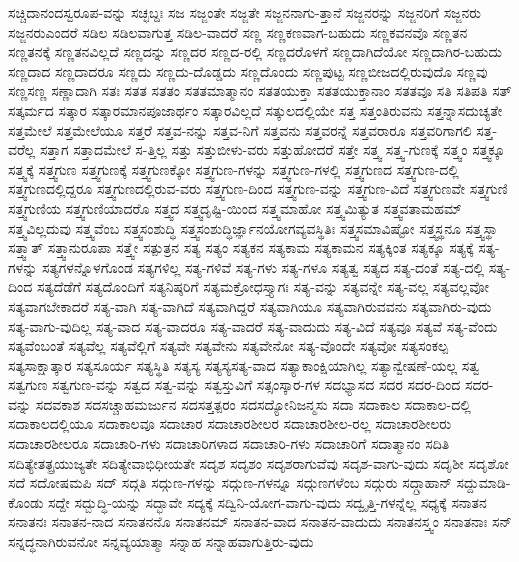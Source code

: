 {ಸಚ್ಚಿದಾನಂದಸ್ವರೂಪ-ವನ್ನು
ಸಚ್ಛಬ್ದಃ
ಸಜ
ಸಜ್ಜಂತೇ
ಸಜ್ಜತೇ
ಸಜ್ಜನನಾಗು-ತ್ತಾನೆ
ಸಜ್ಜನರನ್ನು
ಸಜ್ಜನರಿಗೆ
ಸಜ್ಜನರು
ಸಜ್ಜನರುಎಂದರೆ
ಸಡಿಲ
ಸಡಿಲವಾಗುತ್ತ
ಸಡಿಲ-ವಾದರೆ
ಸಣ್ಣ
ಸಣ್ಣಕಣವಾಗ-ಬಹುದು
ಸಣ್ಣಕವನವೊ
ಸಣ್ಣತನ
ಸಣ್ಣತನಕ್ಕೆ
ಸಣ್ಣತನವಿಲ್ಲದೆ
ಸಣ್ಣದನ್ನು
ಸಣ್ಣದರ
ಸಣ್ಣದ-ರಲ್ಲಿ
ಸಣ್ಣದರೊಳಗೆ
ಸಣ್ಣದಾಗಿದೆಯೋ
ಸಣ್ಣದಾಗಿರ-ಬಹುದು
ಸಣ್ಣದಾದ
ಸಣ್ಣದಾದರೂ
ಸಣ್ಣದು
ಸಣ್ಣದು-ದೊಡ್ಡದು
ಸಣ್ಣದೊಂದು
ಸಣ್ಣಪುಟ್ಟ
ಸಣ್ಣಬೀಜದಲ್ಲಿರುವುದೊ
ಸಣ್ಣವು
ಸಣ್ಣಸಣ್ಣ
ಸಣ್ಣಾದಾಗಿ
ಸತಃ
ಸತತ
ಸತತಂ
ಸತತಮಾತ್ಮಾನಂ
ಸತತಯುಕ್ತಾ
ಸತತಯುಕ್ತಾನಾಂ
ಸತತವೂ
ಸತಿ
ಸತಿಪತಿ
ಸತ್
ಸತ್ಕರ್ಮದ
ಸತ್ಕಾರ
ಸತ್ಕಾರಮಾನಪೂಜಾರ್ಥಂ
ಸತ್ಕಾರವಿಲ್ಲದೆ
ಸತ್ಕುಲದಲ್ಲಿಯೇ
ಸತ್ತ
ಸತ್ತಂತಿರುವನು
ಸತ್ತನ್ನಾಸದುಚ್ಯತೇ
ಸತ್ತಮೇಲೆ
ಸತ್ತಮೇಲೆಯೂ
ಸತ್ತರೆ
ಸತ್ತವ-ನನ್ನು
ಸತ್ತವ-ನಿಗೆ
ಸತ್ತವನು
ಸತ್ತವರನ್ನೆ
ಸತ್ತವರಾರೂ
ಸತ್ತವರಿಗಾಗಲಿ
ಸತ್ತ-ವರೆಲ್ಲ
ಸತ್ತಾಗ
ಸತ್ತಾದಮೇಲೆ
ಸ-ತ್ತಿಲ್ಲ
ಸತ್ತು
ಸತ್ತುಬೀಳು-ವರು
ಸತ್ತುಹೋದರೆ
ಸತ್ತೇ
ಸತ್ತ್ವ
ಸತ್ತ್ವ-ಗುಣಕ್ಕೆ
ಸತ್ತ್ವಂ
ಸತ್ತ್ವಕ್ಕೂ
ಸತ್ತ್ವಕ್ಕೆ
ಸತ್ತ್ವಗುಣ
ಸತ್ತ್ವಗುಣಕ್ಕೆ
ಸತ್ತ್ವಗುಣಕ್ಕೋ
ಸತ್ತ್ವಗುಣ-ಗಳನ್ನು
ಸತ್ತ್ವಗುಣ-ಗಳಲ್ಲಿ
ಸತ್ತ್ವಗುಣದ
ಸತ್ತ್ವಗುಣ-ದಲ್ಲಿ
ಸತ್ತ್ವಗುಣದಲ್ಲಿದ್ದರೂ
ಸತ್ತ್ವಗುಣದಲ್ಲಿರುವ-ವರು
ಸತ್ತ್ವಗುಣ-ದಿಂದ
ಸತ್ತ್ವಗುಣ-ವನ್ನು
ಸತ್ತ್ವಗುಣ-ವಿದೆ
ಸತ್ತ್ವಗುಣವೇ
ಸತ್ತ್ವಗುಣಿ
ಸತ್ತ್ವಗುಣಿಯ
ಸತ್ತ್ವಗುಣಿಯಾದರೊ
ಸತ್ತ್ವದ
ಸತ್ತ್ವದೃಷ್ಟಿ-ಯಿಂದ
ಸತ್ತ್ವಮಾಹೋ
ಸತ್ತ್ವಮಿತ್ಯುತ
ಸತ್ತ್ವವತಾಮಹಮ್
ಸತ್ತ್ವವಿಲ್ಲದುವು
ಸತ್ತ್ವವೆಂಬ
ಸತ್ತ್ವಸಂಶುದ್ಧಿ
ಸತ್ತ್ವಸಂಶುದ್ಧಿರ್ಜ್ಞಾನಯೋಗವ್ಯವಸ್ಥಿತಿಃ
ಸತ್ತ್ವಸಮಾವಿಷ್ಟೋ
ಸತ್ತ್ವಸ್ಥನೂ
ಸತ್ತ್ವಸ್ಥಾ
ಸತ್ತ್ವಾತ್
ಸತ್ತ್ವಾನುರೂಪಾ
ಸತ್ತ್ವೇ
ಸತ್ಪುತ್ರನ
ಸತ್ಯ
ಸತ್ಯಂ
ಸತ್ಯಕನ
ಸತ್ಯಕಾಮ
ಸತ್ಯಕಾಮನ
ಸತ್ಯಕ್ಕಿಂತ
ಸತ್ಯಕ್ಕೂ
ಸತ್ಯಕ್ಕೆ
ಸತ್ಯ-ಗಳನ್ನು
ಸತ್ಯಗಳನ್ನೊಳಗೊಂಡ
ಸತ್ಯಗಳಿಲ್ಲ
ಸತ್ಯ-ಗಳಿವೆ
ಸತ್ಯ-ಗಳು
ಸತ್ಯ-ಗಳೂ
ಸತ್ಯತ್ವ
ಸತ್ಯದ
ಸತ್ಯ-ದಂತೆ
ಸತ್ಯ-ದಲ್ಲಿ
ಸತ್ಯ-ದಿಂದ
ಸತ್ಯದೆಡೆಗೆ
ಸತ್ಯದೊಂದಿಗೆ
ಸತ್ಯನಿಷ್ಠರಿಗೆ
ಸತ್ಯಮಕ್ರೋಧಸ್ತ್ಯಾಗಃ
ಸತ್ಯ-ವನ್ನು
ಸತ್ಯವನ್ನೇ
ಸತ್ಯ-ವಲ್ಲ
ಸತ್ಯವಲ್ಲವೋ
ಸತ್ಯವಾಗಬೇಕಾದರೆ
ಸತ್ಯ-ವಾಗಿ
ಸತ್ಯ-ವಾಗಿದೆ
ಸತ್ಯವಾಗಿದ್ದರೆ
ಸತ್ಯವಾಗಿಯೂ
ಸತ್ಯವಾಗಿರುವವನು
ಸತ್ಯವಾಗಿರು-ವುದು
ಸತ್ಯ-ವಾಗು-ವುದಿಲ್ಲ
ಸತ್ಯ-ವಾದ
ಸತ್ಯ-ವಾದರೂ
ಸತ್ಯ-ವಾದರೆ
ಸತ್ಯ-ವಾದುದು
ಸತ್ಯ-ವಿದೆ
ಸತ್ಯವೂ
ಸತ್ಯವೆ
ಸತ್ಯ-ವೆಂದು
ಸತ್ಯವೆಂಬಂತೆ
ಸತ್ಯವೆಲ್ಲ
ಸತ್ಯವೆಲ್ಲಿಗೆ
ಸತ್ಯವೇ
ಸತ್ಯವೇನು
ಸತ್ಯವೇನೋ
ಸತ್ಯ-ವೊಂದೇ
ಸತ್ಯವೋ
ಸತ್ಯಸಂಕಲ್ಪ
ಸತ್ಯಸಾಕ್ಷಾತ್ಕಾರ
ಸತ್ಯಸೂರ್ಯ
ಸತ್ಯಸ್ಥಿತಿ
ಸತ್ಯಸ್ಯ
ಸತ್ಯಸ್ಯಸತ್ಯ-ವಾದ
ಸತ್ಯಾಕಾಂಕ್ಷಿಯಾಗಿಲ್ಲ
ಸತ್ಯಾನ್ವೇಷಣೆ-ಯಲ್ಲ
ಸತ್ವ
ಸತ್ವಗುಣ
ಸತ್ವಗುಣ-ವನ್ನು
ಸತ್ವದ
ಸತ್ವ-ವನ್ನು
ಸತ್ವಸ್ತುವಿಗೆ
ಸತ್ಸಂಸ್ಕಾರ-ಗಳ
ಸದಭ್ಯಾಸದ
ಸದರ
ಸದರ-ದಿಂದ
ಸದರ-ವನ್ನು
ಸದವಕಾಶ
ಸದಸಚ್ಚಾಹಮರ್ಜುನ
ಸದಸತ್ತತ್ಪರಂ
ಸದಸದ್ಯೋನಿಜನ್ಮಸು
ಸದಾ
ಸದಾಕಾಲ
ಸದಾಕಾಲ-ದಲ್ಲಿ
ಸದಾಕಾಲದಲ್ಲಿಯೂ
ಸದಾಕಾಲವೂ
ಸದಾಚಾರ
ಸದಾಚಾರಶೀಲರ
ಸದಾಚಾರಶೀಲ-ರಲ್ಲ
ಸದಾಚಾರಶೀಲರು
ಸದಾಚಾರಶೀಲರೂ
ಸದಾಚಾರಿ-ಗಳು
ಸದಾಚಾರಿಗಳಾದ
ಸದಾಚಾರಿ-ಗಳು
ಸದಾಚಾರಿಗೆ
ಸದಾತ್ಮಾನಂ
ಸದಿತಿ
ಸದಿತ್ಯೇತತ್ಪ್ರಯುಜ್ಯತೇ
ಸದಿತ್ಯೇವಾಭಿಧೀಯತೇ
ಸದೃಶ
ಸದೃಶಂ
ಸದೃಶರಾಗುವೆವು
ಸದೃಶ-ವಾಗು-ವುದು
ಸದೃಶೀ
ಸದೃಶೋ
ಸದೆ
ಸದೋಷಮಪಿ
ಸದ್
ಸದ್ಗತಿ
ಸದ್ಗುಣ-ಗಳನ್ನು
ಸದ್ಗುಣ-ಗಳನ್ನೂ
ಸದ್ಗುಣಗಳೆಂಬ
ಸದ್ಗುರು
ಸದ್ಗ್ರಾಹಾನ್
ಸದ್ದುಮಾಡಿ-ಕೊಂಡು
ಸದ್ದೇ
ಸದ್ಬುದ್ಧಿ-ಯನ್ನು
ಸದ್ಭಾವೇ
ಸದ್ಯಕ್ಕೆ
ಸದ್ವಿನಿ-ಯೋಗ-ವಾಗು-ವುದು
ಸದ್ವೃತ್ತಿ-ಗಳನ್ನೆಲ್ಲ
ಸಧ್ಯಕ್ಕೆ
ಸನಾತನ
ಸನಾತನಃ
ಸನಾತನ-ನಾದ
ಸನಾತನನೊ
ಸನಾತನಮ್
ಸನಾತನ-ವಾದ
ಸನಾತನ-ವಾದುದು
ಸನಾತನಸ್ತ್ವಂ
ಸನಾತನಾಃ
ಸನ್
ಸನ್ನದ್ಧನಾಗಿರುವನೋ
ಸನ್ನವ್ಯಯಾತ್ಮಾ
ಸನ್ನಾಹ
ಸನ್ನಾಹವಾಗುತ್ತಿರು-ವುದು
}
